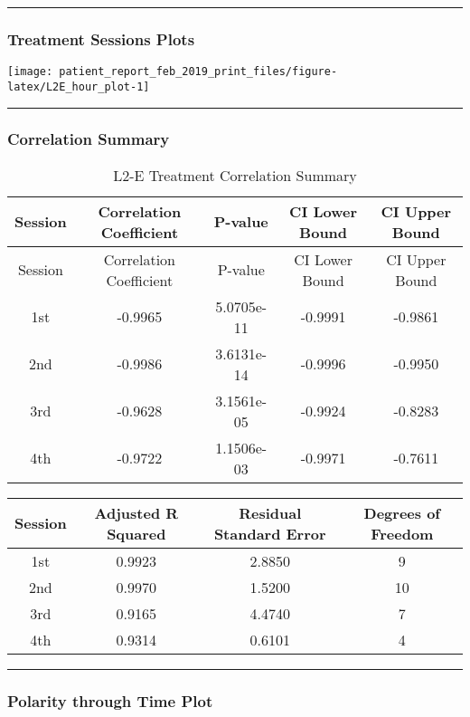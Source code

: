 \documentclass[]{article}
\begin{document}
\begin{center}\rule{0.5\linewidth}{\linethickness}\end{center}

\subsubsection{Treatment Sessions
Plots}\label{treatment-sessions-plots-2}

\texttt{[image: patient\_report\_feb\_2019\_print\_files/figure-latex/L2E\_hour\_plot-1]}

\begin{center}\rule{0.5\linewidth}{\linethickness}\end{center}

\subsubsection{Correlation Summary}\label{correlation-summary-2}

\begin{longtable}[]{@{}ccccc@{}}
\caption{L2-E Treatment Correlation Summary}\tabularnewline
\toprule
Session & Correlation Coefficient & P-value & CI Lower Bound & CI Upper
Bound\tabularnewline
\midrule
\endfirsthead
\toprule
Session & Correlation Coefficient & P-value & CI Lower Bound & CI Upper
Bound\tabularnewline
\midrule
\endhead
1st & -0.9965 & 5.0705e-11 & -0.9991 & -0.9861\tabularnewline
2nd & -0.9986 & 3.6131e-14 & -0.9996 & -0.9950\tabularnewline
3rd & -0.9628 & 3.1561e-05 & -0.9924 & -0.8283\tabularnewline
4th & -0.9722 & 1.1506e-03 & -0.9971 & -0.7611\tabularnewline
\bottomrule
\end{longtable}

\begin{longtable}[]{@{}cccc@{}}
\toprule
Session & Adjusted R Squared & Residual Standard Error & Degrees of
Freedom\tabularnewline
\midrule
\endhead
1st & 0.9923 & 2.8850 & 9\tabularnewline
2nd & 0.9970 & 1.5200 & 10\tabularnewline
3rd & 0.9165 & 4.4740 & 7\tabularnewline
4th & 0.9314 & 0.6101 & 4\tabularnewline
\bottomrule
\end{longtable}

\begin{center}\rule{0.5\linewidth}{\linethickness}\end{center}

\subsubsection{Polarity through Time
Plot}\label{polarity-through-time-plot-2}
\end{document}

